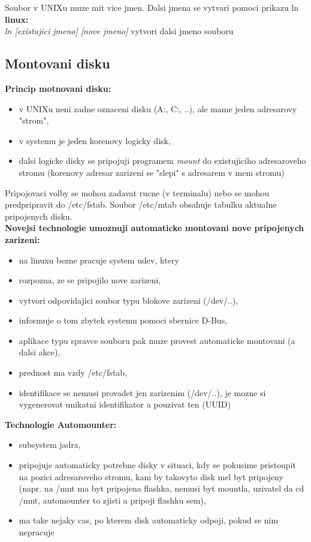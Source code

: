 \documentclass[a4paper, 11pt]{article}
\begin{document}
Soubor v UNIXu muze mit vice jmen. Dalsi jmena se vytvari pomoci prikazu ln \\

\textbf{linux:} \\[0.5em]
\textit{ln [existujici jmeno] [nove jmeno]} vytvori dalsi jmeno souboru \\

\newpage

\subsection{Montovani disku}
\textbf{Princip motnovani disku:}
\begin{itemize}
    \item v UNIXu neni zadne oznaceni disku (A:, C:, ..), ale mame jeden adresarovy "strom",
    \item v systemu je jeden korenovy logicky disk,
    \item dalsi logicke disky se pripojuji programem \textit{mount} do existujiciho adresaroveho stromu (korenovy adresar zarizeni se "slepi" s adresarem v mem stromu) \\
\end{itemize}

Pripojovaci volby se mohou zadavat rucne (v terminalu) nebo se mohou predpripravit do /etc/fstab. Soubor /etc/mtab obsahuje tabulku aktualne pripojenych disku. \\

\textbf{Novejsi technologie umoznuji automaticke montovani nove pripojenych zarizeni:}
\begin{itemize}
    \item na linuxu bezne pracuje system udev, ktery
    \item rozpozna, ze se pripojilo nove zarizeni,
    \item vytvori odpovidajici soubor typu blokove zarizeni (/dev/..),
    \item informuje o tom zbytek systemu pomoci sbernice D-Bus,
    \item aplikace typu spravce souboru pak muze provest automaticke montovani (a dalsi akce),
    \item prednost ma vzdy /etc/fstab,
    \item identifikace se nemusi provadet jen zarizenim (/dev/..), je mozne si vygenerovat unikatni identifikator a pouzivat ten (UUID) \\
\end{itemize}

\textbf{Technologie Automounter:}
\begin{itemize}
    \item subsystem jadra,
    \item pripojuje automaticky potrebne disky v situaci, kdy se pokusime pristoupit na pozici adresaroveho stromu, kam by takovyto disk mel byt pripojeny (napr. na /mnt ma byt pripojena flashka, nemusi byt mountla, uzivatel da cd /mnt, automounter to zjisti a pripoji flashku sem),
    \item ma take nejaky cas, po kterem disk automaticky odpoji, pokud se nim nepracuje  \\
\end{itemize}
\end{document}
